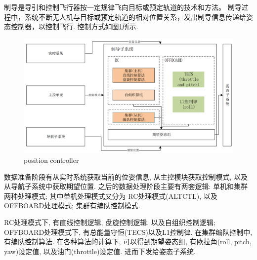 制导是导引和控制飞行器按一定规律飞向目标或预定轨道的技术和方法。
制导过程中，系统不断无人机与目标或预定轨道的相对位置关系，发出制导信息传递给姿态控制器，以控制飞行. 控制方式如图\ref{fig:posi}所示.
\begin{figure}[htbp]
        \centering
        \includegraphics[width=\textwidth]{pictures/positionCtrl.png}
        \caption{position controller}
        \label{fig:posi}
    \end{figure}
\par 数据准备阶段有从实时系统获取当前的位姿信息, 从主控模块获取控制模式, 以及从导航子系统中获取期望位置. 之后的数据处理阶段主要有两套逻辑: 单机和集群两种处理模式; 
其中单机处理模式又分为 RC处理模式(ALTCTL), 以及OFFBOARD处理模式; 集群有编队控制模式. 
\par 
RC处理模式下, 有直线控制逻辑, 盘旋控制逻辑, 以及自组织控制逻辑; OFFBOARD处理模式下, 有总能量守恒(TECS)以及L1控制律. 在集群编队控制中, 有编队控制算法. 在各种算法的计算下, 可以得到期望姿态组, 有欧拉角(roll, pitch, yaw)设定值, 以及油门(throttle)设定值. 
进而下发给姿态子系统. 

